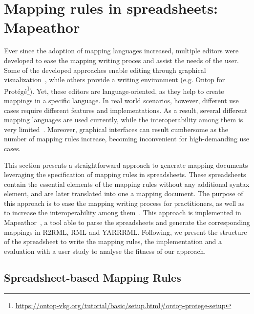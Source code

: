 \section{Mapping rules in spreadsheets: Mapeathor}
\label{sec:chp5_mapeathor}

Ever since the adoption of mapping languages increased, multiple  editors were developed to ease the mapping writing proces and assist the needs of the user. Some of the developed approaches enable editing through graphical visualization~\citep{heyvaert2016rmleditor,sicilia2017map}, while others provide a writing environment (e.g. Ontop for Protégé\footnote{\url{https://ontop-vkg.org/tutorial/basic/setup.html\#ontop-protege-setup}}). Yet, these editors are language-oriented, as they help to create mappings in a specific language. In real world scenarios, however, different use cases require different features and implementations. As a result, several different mapping languages are used currently, while the interoperability among them is very limited~\cite{iglesias2022devising}. Moreover, graphical interfaces can result cumbersome as the number of mapping rules increase, becoming inconvenient for high-demanding use cases. 


This section presents a straightforward approach to generate mapping documents leveraging the specification of mapping rules in spreadsheets. These spreadsheets contain the essential elements of the mapping rules without any additional syntax element, and are later translated into one a mapping document. The purpose of this approach is to ease the mapping writing process for practitioners, as well as to increase the interoperability among them~\citep{corcho2020towards, iglesias2022devising}. This approach is implemented in Mapeathor~\citep{iglesias-molina_2023_5973906}, a tool able to parse the spreadsheets and generate the corresponding mappings in R2RML, RML and YARRRML. Following, we present the structure of the spreadsheet to write the mapping rules, the implementation and a evaluation with a user study to analyse the fitness of our approach.

\subsection{Spreadsheet-based Mapping Rules}
\label{sec:chp5_spreadsheet_design}

